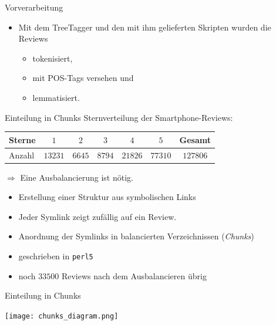 \documentclass[note=hide]{beamer} %
\newcommand{\proglang}[1]{\texttt{#1}}
\begin{document}
\begin{frame}[fragile]{Vorverarbeitung}
	\begin{itemize}
		\item Mit dem TreeTagger und den mit ihm gelieferten Skripten wurden die Reviews
			\begin{itemize}
				\item tokenisiert,
				\item mit POS-Tags versehen und
				\item lemmatisiert. \\[0.3cm]
			\end{itemize}
	\end{itemize}
	
\end{frame}

\begin{frame}{Einteilung in Chunks}
	Sternverteilung der Smartphone-Reviews:
	\begin{center}
		\renewcommand{\arraystretch}{1.3}
		\begin{tabular}{l|*{5}{c}|c}
			Sterne & $1$ & $2$ & $3$ & $4$ & $5$ & Gesamt \\
			\hline
			Anzahl & $13231$ & $6645$ & $8794$ & $21826$ & $77310$ & $127806$ \\
		\end{tabular}
	\end{center}
	\vspace{0.3cm}
	$\Rightarrow$ Eine Ausbalancierung ist nötig.\\[0.3cm]
	\begin{itemize}
		\item Erstellung einer Struktur aus symbolischen Links
		\item Jeder Symlink zeigt zufällig auf ein Review.
		\item Anordnung der Symlinks in balancierten Verzeichnissen (\emph{Chunks})
		\item geschrieben in \proglang{perl5}
		\item noch $33500$ Reviews nach dem Ausbalancieren übrig
	\end{itemize}
\end{frame}

\begin{frame}{Einteilung in Chunks}
	\begin{center}
		\texttt{[image: chunks\_diagram.png]}
	\end{center}
\end{frame}
\end{document}
